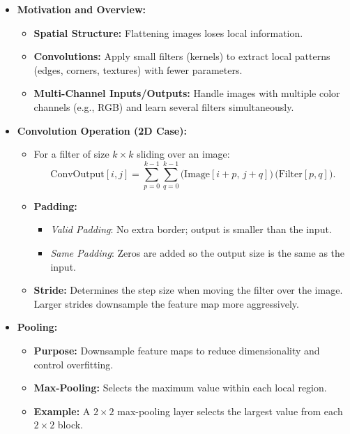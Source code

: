 \documentclass{article}
\begin{document}
\begin{itemize}
        \item \textbf{Motivation and Overview:}
        \begin{itemize}
            \item \textbf{Spatial Structure:} Flattening images loses local information.
            \item \textbf{Convolutions:} Apply small filters (kernels) to extract local patterns (edges, corners, textures) with fewer parameters.
            \item \textbf{Multi-Channel Inputs/Outputs:} Handle images with multiple color channels (e.g., RGB) and learn several filters simultaneously.
        \end{itemize}
        
        \item \textbf{Convolution Operation (2D Case):}
        \begin{itemize}
            \item For a filter of size \(k \times k\) sliding over an image:
            \[
            \text{ConvOutput}[i,j] = \sum_{p=0}^{k-1} \sum_{q=0}^{k-1} \bigl(\text{Image}[i+p,\,j+q]\bigr) \, \bigl(\text{Filter}[p,q]\bigr).
            \]
            \item \textbf{Padding:}
            \begin{itemize}
                \item \textit{Valid Padding}: No extra border; output is smaller than the input.
                \item \textit{Same Padding}: Zeros are added so the output size is the same as the input.
            \end{itemize}
            \item \textbf{Stride:} Determines the step size when moving the filter over the image. Larger strides downsample the feature map more aggressively.
        \end{itemize}
        
        \item \textbf{Pooling:}
        \begin{itemize}
            \item \textbf{Purpose:} Downsample feature maps to reduce dimensionality and control overfitting.
            \item \textbf{Max-Pooling:} Selects the maximum value within each local region.
            \item \textbf{Example:} A \(2\times2\) max-pooling layer selects the largest value from each \(2\times2\) block.
        \end{itemize}
        

\end{itemize}
\end{document}

